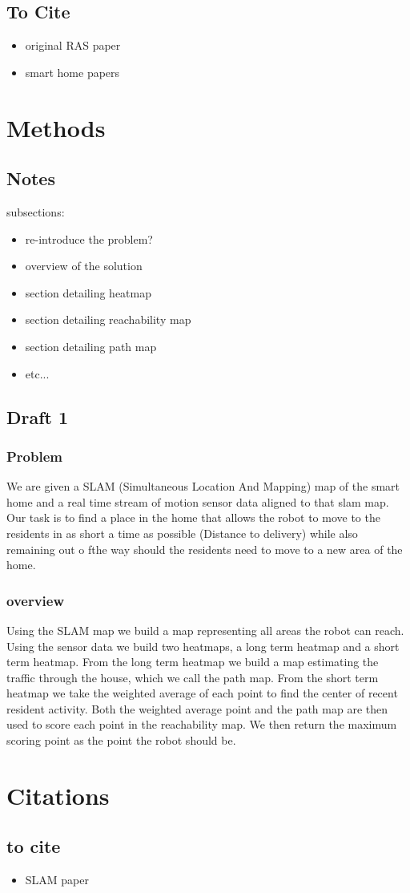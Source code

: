 \documentclass[11pt, conference, a4paper]{IEEEtran}
\begin{document}
\subsection{To Cite}
\begin{itemize}
    \item original RAS paper
    \item smart home papers
\end{itemize}

\section{Methods}

\subsection{Notes}
subsections:
\begin{itemize}
    \item re-introduce the problem?
    \item overview of the solution
    \item section detailing heatmap
    \item section detailing reachability map
    \item section detailing path map
    \item etc...
\end{itemize}

\subsection{Draft 1}

\subsubsection{Problem}
We are given a SLAM (Simultaneous Location And Mapping) map of the smart home
and a real time stream of motion sensor data aligned to that slam map.
Our task is to find a place in the home that allows the robot to move to the
residents in as short a time as possible (Distance to delivery) while also
remaining out o fthe way should the residents need to move to a new area of
the home.

\subsubsection{overview}
Using the SLAM map we build a map representing all areas the robot can reach.
Using the sensor data we build two heatmaps, a long term heatmap and a short
term heatmap. From the long term heatmap we build a map estimating the traffic
through the house, which we call the path map. From the short term heatmap we 
take the weighted average of each point to find the center of recent resident 
activity. Both the weighted average point and the path map are then used to
score each point in the reachability map. We then return the maximum scoring
point as the point the robot should be.

\section{Citations}
\subsection{to cite}
\begin{itemize}
    \item SLAM paper
\end{itemize}
\end{document}
